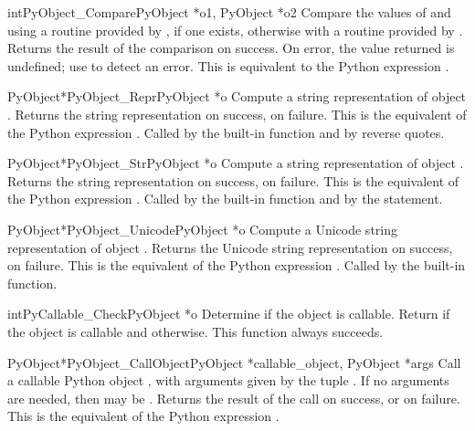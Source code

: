 \documentclass{manual}
\begin{document}
\begin{cfuncdesc}{int}{PyObject_Compare}{PyObject *o1, PyObject *o2}
Compare the values of  and  using a routine provided
by , if one exists, otherwise with a routine provided by
.  Returns the result of the comparison on success.  On error,
the value returned is undefined; use  to
detect an error.  This is equivalent to the Python
expression .
\end{cfuncdesc}


\begin{cfuncdesc}{PyObject*}{PyObject_Repr}{PyObject *o}
Compute a string representation of object .  Returns the
string representation on success, \NULL{} on failure.  This is
the equivalent of the Python expression .
Called by the  built-in function
and by reverse quotes.
\end{cfuncdesc}


\begin{cfuncdesc}{PyObject*}{PyObject_Str}{PyObject *o}
Compute a string representation of object .  Returns the
string representation on success, \NULL{} on failure.  This is
the equivalent of the Python expression .
Called by the  built-in function and
by the  statement.
\end{cfuncdesc}


\begin{cfuncdesc}{PyObject*}{PyObject_Unicode}{PyObject *o}
Compute a Unicode string representation of object .  Returns the
Unicode string representation on success, \NULL{} on failure.  This is
the equivalent of the Python expression .
Called by the  built-in function.
\end{cfuncdesc}


\begin{cfuncdesc}{int}{PyCallable_Check}{PyObject *o}
Determine if the object  is callable.  Return  if the
object is callable and  otherwise.
This function always succeeds.
\end{cfuncdesc}


\begin{cfuncdesc}{PyObject*}{PyObject_CallObject}{PyObject *callable_object,
                                                  PyObject *args}
Call a callable Python object , with
arguments given by the tuple .  If no arguments are
needed, then  may be \NULL{}.  Returns the result of the
call on success, or \NULL{} on failure.  This is the equivalent
of the Python expression .
\end{cfuncdesc}
\end{document}
